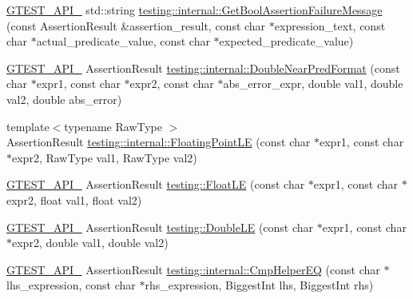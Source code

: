 \begin{DoxyCompactItemize}
\item 
\mbox{\hyperlink{_obj__test_2lib_2googletest-release-1_88_81_2googletest_2include_2gtest_2internal_2gtest-port_8h_aa73be6f0ba4a7456180a94904ce17790}{G\+T\+E\+S\+T\+\_\+\+A\+P\+I\+\_\+}} std\+::string \mbox{\hyperlink{namespacetesting_1_1internal_a5fd6e5dc9eb20ab3c3a80e24d89dfac6}{testing\+::internal\+::\+Get\+Bool\+Assertion\+Failure\+Message}} (const Assertion\+Result \&assertion\+\_\+result, const char $\ast$expression\+\_\+text, const char $\ast$actual\+\_\+predicate\+\_\+value, const char $\ast$expected\+\_\+predicate\+\_\+value)
\item 
\mbox{\hyperlink{_obj__test_2lib_2googletest-release-1_88_81_2googletest_2include_2gtest_2internal_2gtest-port_8h_aa73be6f0ba4a7456180a94904ce17790}{G\+T\+E\+S\+T\+\_\+\+A\+P\+I\+\_\+}} Assertion\+Result \mbox{\hyperlink{namespacetesting_1_1internal_a4f70b36c624b54c2362aeecc2f05ee8c}{testing\+::internal\+::\+Double\+Near\+Pred\+Format}} (const char $\ast$expr1, const char $\ast$expr2, const char $\ast$abs\+\_\+error\+\_\+expr, double val1, double val2, double abs\+\_\+error)
\item 
{\footnotesize template$<$typename Raw\+Type $>$ }\\Assertion\+Result \mbox{\hyperlink{namespacetesting_1_1internal_a17b52b6b1f81f6dcad5cc4d12e5173a6}{testing\+::internal\+::\+Floating\+Point\+LE}} (const char $\ast$expr1, const char $\ast$expr2, Raw\+Type val1, Raw\+Type val2)
\item 
\mbox{\hyperlink{_obj__test_2lib_2googletest-release-1_88_81_2googletest_2include_2gtest_2internal_2gtest-port_8h_aa73be6f0ba4a7456180a94904ce17790}{G\+T\+E\+S\+T\+\_\+\+A\+P\+I\+\_\+}} Assertion\+Result \mbox{\hyperlink{namespacetesting_a2c9a2a391c72a7b02ea3024586e33af0}{testing\+::\+Float\+LE}} (const char $\ast$expr1, const char $\ast$expr2, float val1, float val2)
\item 
\mbox{\hyperlink{_obj__test_2lib_2googletest-release-1_88_81_2googletest_2include_2gtest_2internal_2gtest-port_8h_aa73be6f0ba4a7456180a94904ce17790}{G\+T\+E\+S\+T\+\_\+\+A\+P\+I\+\_\+}} Assertion\+Result \mbox{\hyperlink{namespacetesting_ae10e2bb304b74abd1b06a2d912a8b43b}{testing\+::\+Double\+LE}} (const char $\ast$expr1, const char $\ast$expr2, double val1, double val2)
\item 
\mbox{\hyperlink{_obj__test_2lib_2googletest-release-1_88_81_2googletest_2include_2gtest_2internal_2gtest-port_8h_aa73be6f0ba4a7456180a94904ce17790}{G\+T\+E\+S\+T\+\_\+\+A\+P\+I\+\_\+}} Assertion\+Result \mbox{\hyperlink{namespacetesting_1_1internal_a46582d95cbfe3d3d8f6945c9e9cd779c}{testing\+::internal\+::\+Cmp\+Helper\+EQ}} (const char $\ast$lhs\+\_\+expression, const char $\ast$rhs\+\_\+expression, Biggest\+Int lhs, Biggest\+Int rhs)

\end{DoxyCompactItemize}
